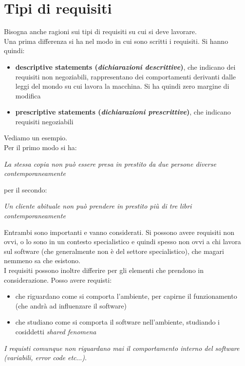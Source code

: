 \documentclass[a4paper,12pt, oneside]{book}
\begin{document}
\section{Tipi di requisiti}
Bisogna anche ragioni sui tipi di requisiti su cui si deve lavorare.\\
Una prima differenza si ha nel modo in cui sono scritti i requisiti. Si hanno
quindi:
\begin{itemize}
  \item \textbf{descriptive statements (\textit{dichiarazioni descrittive})},
  che indicano dei requisiti non negoziabili, rappresentano dei comportamenti
  derivanti dalle leggi del mondo su cui lavora la macchina. Si ha quindi zero
  margine di modifica
  \item \textbf{prescriptive statements (\textit{dichiarazioni prescrittive})},
  che indicano requisiti negoziabili
\end{itemize}
\begin{esempio}
  Vediamo un esempio.\\
  Per il primo modo si ha:
  \begin{center}
    \textit{La stessa copia non può essere presa in prestito da due persone
      diverse contemporaneamente}
  \end{center}
  per il secondo:
  \begin{center}
    \textit{Un cliente abituale non può prendere in prestito più di tre libri
      contemporaneamente}
  \end{center}
\end{esempio}
Entrambi sono importanti e vanno considerati. Si possono avere requisiti non
ovvi, o lo sono in un contesto specialistico e quindi spesso non ovvi a chi
lavora sul software (che generalmente non è del settore specialistico), che
magari nemmeno sa che esistono.\\
I requisiti possono inoltre differire per gli elementi che prendono in
considerazione. Posso avere requisti:
\begin{itemize}
  \item che riguardano come si comporta l'ambiente, per capirne il funzionamento
  (che andrà ad influenzare il software)
  \item che studiano come si comporta il software nell'ambiente, studiando i
  cosiddetti \textit{shared fenomena}
\end{itemize}
\textit{I requisti comunque non riguardano mai il comportamento interno del
  software (variabili, error code etc$\ldots$)}.\\
\end{document}
